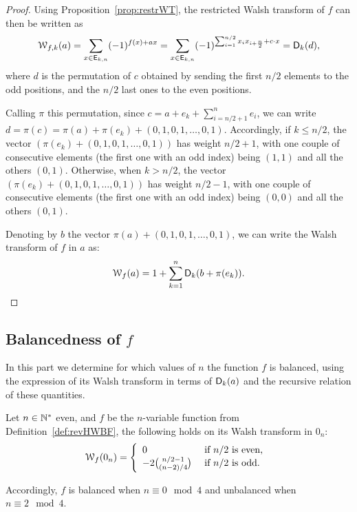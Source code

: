 \documentclass[11pt]{llncs}
\begin{document}
\begin{proof}
Using Proposition~\ref{prop:restrWT}, the restricted Walsh transform of $f$ can then be written as \[
\wtk{f}{k}(a)=\sum_{x \in \Ekn{k}{n}} (-1)^{f(x)+ax}=\sum_{x \in \Ekn{k}{n}} (-1)^{\sum_{i=1}^{n/2} x_i x_{i+\frac{n}{2}}+ c \cdot x}=\Dnka{n}{k}{d},\]
where $d$ is the permutation of $c$ obtained by sending the first $n/2$ elements to the odd positions, and the $n/2$ last ones to the even positions. 

Calling $\pi$ this permutation, since $c=a+e_k+\sum_{i=n/2+1}^n e_i$, we can write $d=\pi(c)=\pi(a)+ \pi(e_k)+ (0,1,0,1,\ldots,0,1)$. 
Accordingly, if $k\le n/2$, the vector $(\pi(e_k)+ (0,1,0,1,\ldots,0,1))$ has weight $n/2+1$, with one couple of consecutive elements (the first one with an odd index) being $(1,1)$ and all the others $(0,1)$. 
Otherwise,  when $k> n/2$, the vector $(\pi(e_k)+ (0,1,0,1,\ldots,0,1))$ has weight $n/2-1$, with one couple of consecutive elements (the first one with an odd index) being $(0,0)$ and all the others $(0,1)$. 

Denoting by $b$ the vector $\pi(a)+(0,1,0,1,\ldots,0,1)$, we can write the Walsh transform of $f$ in $a$ as:
\[ \wt{f}(a)=1+\sum_{k=1}^n\Dnka{n}{k}{b+\pi(e_k)}.\qedhere\]
\end{proof}

\subsection{Balancedness of $f$}\label{sec:balancedness}

In this part we determine for which values of $n$ the function $f$ is balanced, using the expression of its Walsh transform in terms of $\Dnka{n}{k}{a}$ and the recursive relation of these quantities.


\begin{theorem}[Balancedness of $f$]\label{th:bal}
	Let $n \in \N^*$ even, and $f$ be the $n$-variable function from Definition~\ref{def:revHWBF}, the following holds on its Walsh transform in $0_n$:
	\[\wt{f}(0_n)= \left \{
	\begin{array}{l l}
	0 & \text{ if } n/2 \text{ is even, } \\
	-2 \binom{n/2-1}{(n-2)/4} & \text{ if }  n/2 \text{ is odd.}
	\end{array}\right.\]
	
	Accordingly, $f$ is balanced when $n \equiv 0\mod 4$ and unbalanced when $n\equiv 2 \mod 4$.
	
\end{theorem}
\end{document}

